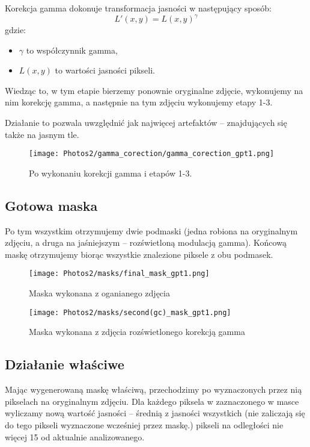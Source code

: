 \documentclass[]{mwart}
\begin{document}
Korekcja gamma dokonuje transformacja jasności w następujący sposób:
\begin{equation}
    L'(x,y) = L(x,y)^{\gamma}
\end{equation}
gdzie:
\begin{itemize}
    \item $\gamma$ to współczynnik gamma,
    \item $L(x,y)$ to wartości jasności pikseli.
\end{itemize}

Wiedząc to, w tym etapie bierzemy ponownie oryginalne zdjęcie, wykonujemy
na nim korekcję gamma, a następnie na tym zdjęciu wykonujemy etapy 1-3.

Działanie to pozwala uwzględnić jak najwięcej artefaktów
-- znajdujących się także na jasnym tle.

\begin{figure}[H]
    \centering
    \texttt{[image: Photos2/gamma\_corection/gamma\_corection\_gpt1.png]}
    \caption{Po wykonaniu korekcji gamma i etapów 1-3.}
\end{figure}

\newpage
\subsection{Gotowa maska}
Po tym wszystkim otrzymujemy dwie podmaski (jedna robiona na oryginalnym
zdjęciu, a druga na jaśniejszym -- rozświetloną modulacją gamma).
Końcową maskę otrzymujemy biorąc wszystkie znalezione piksele z obu podmasek.

\begin{figure}[H]
    \centering
    \texttt{[image: Photos2/masks/final\_mask\_gpt1.png]}
    \caption{Maska wykonana z oganianego zdjęcia}
\end{figure}
\begin{figure}[H]
    \centering
    \texttt{[image: Photos2/masks/second(gc)\_mask\_gpt1.png]}
    \caption{Maska wykonana z zdjęcia rozświetlonego korekcją gamma}
\end{figure}


\newpage
\subsection{Działanie właściwe}
Mając wygenerowaną maskę właściwą, przechodzimy po wyznaczonych
przez nią pikselach na oryginalnym zdjęciu. Dla każdego piksela w
zaznaczonego w masce wyliczamy nową wartość jasności -- średnią z
jasności wszystkich (nie zaliczają się do tego pikseli wyznaczone
wcześniej przez maskę.) pikseli na odległości nie więcej 15 od aktualnie analizowanego.
\end{document}
